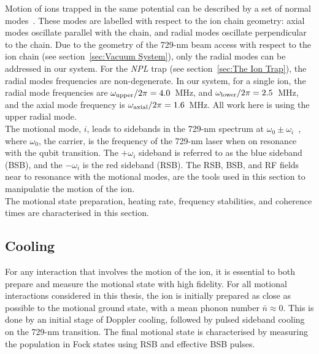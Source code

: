     Motion of ions trapped in the same potential can be described by a set of normal modes~\cite{james1998quantum}. These modes are labelled with respect to the ion chain geometry: axial modes oscillate parallel with the chain, and radial modes oscillate perpendicular to the chain. Due to the geometry of the 729-nm beam access with respect to the ion chain (see section~\ref{sec:Vacuum System}), only the radial modes can be addressed in our system. For the \emph{NPL} trap (see section~\ref{sec:The Ion Trap}), the radial modes frequencies are non-degenerate. In our system, for a single ion, the radial mode frequencies are $\omega_{\rm upper}/2\pi = 4.0$~\unit{\MHz}, and $\omega_{\rm lower}/2\pi = 2.5$~\unit{\MHz}, and the axial mode frequency is $\omega_{\rm axial}/2\pi = 1.6$~\unit{\MHz}. All work here is using the upper radial mode. \\
    The motional mode, $i$, leads to sidebands in the 729-nm spectrum at $\omega_0 \pm \omega_{i}$~\cite{ozeri2011tutorial}, where $\omega_0$, the carrier, is the frequency of the 729-nm laser when on resonance with the qubit transition. The $+\omega_i$ sideband is referred to as the blue sideband (BSB), and the $-\omega_i$ is the red sideband (RSB).
    The RSB, BSB, and RF fields near to resonance with the motional modes, are the tools used in this section to manipulatie the motion of the ion.\\
    The motional state preparation, heating rate, frequency stabilities, and coherence times are characterised in this section.

\subsection{Cooling}
\label{sec:Cooling}

    For any interaction that involves the motion of the ion, it is essential to both prepare and measure the motional state with high fidelity. For all motional interactions considered in this thesis, the ion is initially prepared as close as possible to the motional ground state, with a mean phonon number $\bar{n} \approx 0$. This is done by an initial stage of Doppler cooling, followed by pulsed sideband cooling on the 729-nm transition. The final motional state is characterised by measuring the population in Fock states using RSB and effective BSB pulses.\\

